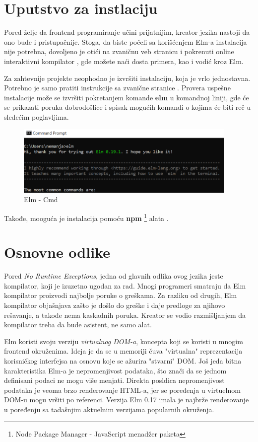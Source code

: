 \documentclass[12pt,oneside]{memoir}
\begin{document}
\section{Uputstvo za instlaciju}
Pored želje da frontend programiranje učini prijatnijim, kreator jezika nastoji 
da ono bude i pristupačnije. Stoga, da biste počeli sa korišćenjem Elm-a instalacija 
nije potrebna, dovoljeno je otići na zvaničnu veb stranicu i pokrenuti online 
interaktivni kompilator \cite{tryelm}, gde možete naći dosta primera, kao i vodić kroz Elm.

Za zahtevnije projekte neophodno je izvršiti instalaciju, koja je vrlo
jednostavna. Potrebno je samo pratiti instrukcije sa zvanične stranice
\cite{installelm}. Provera uspešne instalacije može se izvršiti pokretanjem
komande \textbf{elm}  u komandnoj liniji, gde će se prikazati poruka
dobrodošlice i spisak mogućih komandi o kojima će biti reč u sledećim poglavljima. 
\begin{figure}[!ht]
  \centering
  \includegraphics[width=0.95\textwidth]{elm-cmd.png}
  \caption{Elm - Cmd}
\end{figure}

Takođe, mooguća je instalacija pomoću \textbf{npm}
\footnote{Node Package Manager - JavaScript menadžer paketa} alata \cite{npm}.

\section{Osnovne odlike}
Pored \emph{No Runtime Exceptions}, jedna od glavnih odlika ovog jezika jeste
kompilator, koji je izuzetno ugodan za rad. Mnogi programeri smatraju da Elm
kompilator proizvodi najbolje poruke o greškama. Za razliku od drugih, Elm
kompilator objašnjava zašto je došlo do greške i daje predloge za njihovo rešavanje,
a takođe nema kaskadnih poruka. Kreator se vodio razmišljanjem da kompilator treba
da bude asistent, ne samo alat.

Elm koristi svoju verziju \emph{virtualnog DOM-a}, koncepta koji se koristi u mnogim
frontend okruženima. Ideja je da se u memoriji čuva "virtualna" reprezentacija
korisničkog interfejsa  na osnovu koje se ažurira "stvarni" DOM. Još jeda bitna
karakteristika Elm-a je nepromenjivost podataka, što znači da se jednom definisani
podaci ne mogu više menjati. Direkta posldica nepromenjivost podataka je veoma
brzo renderovanje HTML-a, jer se poređenja u virtuelnom DOM-u mogu vršiti po referenci. 
Verzija Elm 0.17 imala je najbrže renderovanje u poređenju sa tadašnjim aktuelnim verzijama 
popularnih okruženja.
\end{document}
